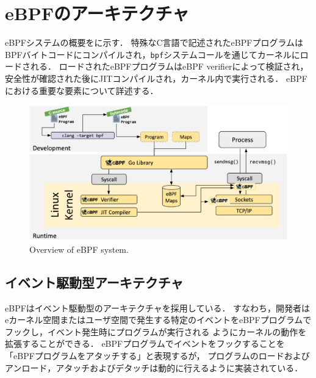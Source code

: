 \section{eBPFのアーキテクチャ}
eBPFシステムの概要をに示す．
特殊なC言語で記述されたeBPFプログラムはBPFバイトコードにコンパイルされ，\texttt{bpf}システムコールを通じてカーネルにロードされる．
ロードされたeBPFプログラムはeBPF verifierによって検証され，安全性が確認された後にJITコンパイルされ，カーネル内で実行される．
eBPFにおける重要な要素について詳述する．
\begin{figure}[t]
  \begin{center}
    \includegraphics[width=0.8\columnwidth]{doc/img/ebpf-overview.eps}
  \end{center}
  \caption{Overview of eBPF system. \cite{WhatiseB81:online}}
  \label{fig:ebpf-overview}
\end{figure}

\subsection{イベント駆動型アーキテクチャ}
eBPFはイベント駆動型のアーキテクチャを採用している．
すなわち，開発者はeカーネル空間またはユーザ空間で発生する特定のイベントをeBPFプログラムでフックし，イベント発生時にプログラムが実行される
ようにカーネルの動作を拡張することができる．
eBPFプログラムでイベントをフックすることを「eBPFプログラムをアタッチする」と表現するが，
プログラムのロードおよびアンロード，アタッチおよびデタッチは動的に行えるように実装されている．
